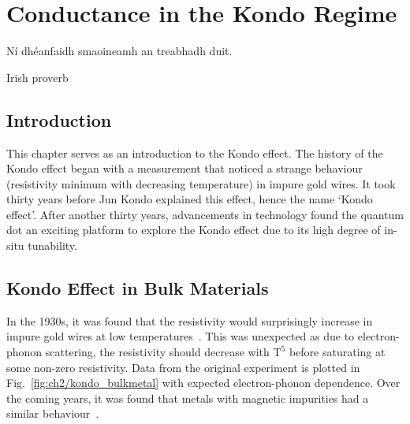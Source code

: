 \chapter{Conductance in the Kondo Regime}\label{cha:kondo_conductance}


\epigraph{Ní dhéanfaidh smaoineamh an treabhadh duit.}{Irish proverb}


\section{Introduction}
\noindent This chapter serves as an introduction to the Kondo effect. The history of the Kondo effect began with a measurement that noticed a strange behaviour (resistivity minimum with decreasing temperature) in impure gold wires. It took thirty years before Jun Kondo explained this effect, hence the name `Kondo effect'. After another thirty years, advancements in technology found the quantum dot an exciting platform to explore the Kondo effect due to its high degree of in-situ tunability. 


\section{Kondo Effect in Bulk Materials}


In the 1930s, it was found that the resistivity would surprisingly increase in impure gold wires at low temperatures~\cite{de_haas}. This was unexpected as due to electron-phonon scattering, the resistivity should decrease with $\mathrm{T^5}$ before saturating at some non-zero resistivity. Data from the original experiment is plotted in Fig.~\ref{fig:ch2/kondo_bulkmetal} with expected electron-phonon dependence. Over the coming years, it was found that metals with magnetic impurities had a similar behaviour~\cite{still_irresistible}.


